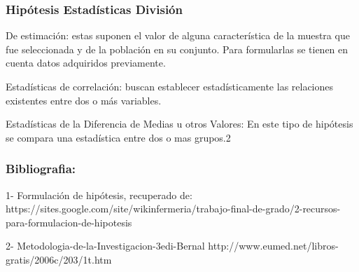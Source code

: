 \documentclass{beamer}
\begin{document}
							\begin{frame}
								\frametitle{Hipótesis Estadísticas División}
								\begin{definition}
								De estimación: 
								estas suponen el valor de alguna característica de la muestra que fue seleccionada y de la población en su conjunto. Para formularlas se tienen en cuenta datos adquiridos previamente.
								
								Estadísticas de correlación: 
								buscan establecer estadísticamente las relaciones existentes entre dos o más variables.	
								
								Estadísticas de la Diferencia de Medias u otros Valores:
								En este tipo de hipótesis se compara una estadística entre dos o mas grupos.{2}
								
							
								\end{definition}
								
							\end{frame}
								\begin{frame}
									\frametitle{Bibliografia:}
									\begin{definition}
									1- Formulación de hipótesis, recuperado de: https://sites.google.com/site/wikinfermeria/trabajo-final-de-grado/2-recursos-para-formulacion-de-hipotesis
									
									2- Metodologia-de-la-Investigacion-3edi-Bernal
									http://www.eumed.net/libros-gratis/2006c/203/1t.htm
									
										
									\end{definition}
									
								\end{frame}					
\end{document}
